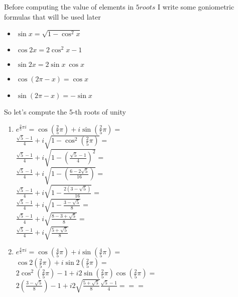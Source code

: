 \documentclass{article}
\begin{document}
Before computing the value of elements in \(5roots\) I write some goniometric formulas that will be used later

\begin{itemize}
    \item \(\sin x = \sqrt{1 - \cos^2 x}\)
    \item \(\cos 2x = 2 \cos^2 x - 1\)
    \item \(\sin 2x = 2\sin x \ \cos x\)
    \item \(\cos \left(2 \pi - x\right) = \cos x \)
    \item \(\sin \left(2 \pi - x\right) = - \sin x \)
\end{itemize}

So let's compute the 5-th roots of unity 

\begin{enumerate}
    \item \(e^{\frac{2}{5} \pi i } = 
        \cos \left( \frac{2}{5} \pi \right) + i \sin \left( \frac{2}{5} \pi \right) = \) \\
        \( \frac{\sqrt{5} - 1}{4} + i \sqrt{1 - \cos^2 \left( \frac{2}{5} \pi \right) } = \) \\
        \( \frac{\sqrt{5} - 1}{4} + i \sqrt{1 - \left( \frac{\sqrt{5} - 1}{4}  \right)^2 } =  \) \\
        \( \frac{\sqrt{5} - 1}{4} + i \sqrt{1 - \left( \frac{6 -2 \sqrt{5} }{16}  \right) } = \) \\
        \(  \frac{\sqrt{5} - 1}{4} + i \sqrt{1 - \frac{2 \left(3 - \sqrt{5}\right) }{16} } = \) \\
       \(  \frac{\sqrt{5} - 1}{4} + i \sqrt{1 - \frac{3 - \sqrt{5}}{8} } = \) \\
        \( \frac{\sqrt{5} - 1}{4} + i \sqrt{ \frac{8 -3 + \sqrt{5}}{8} } = \) \\
        \( \frac{\sqrt{5} - 1}{4} + i \sqrt{ \frac{5 + \sqrt{5}}{8} }
        \)
    \item \(e^{\frac{4}{5} \pi i } = 
        \cos \left( \frac{4}{5} \pi \right) + i \sin \left( \frac{4}{5} \pi \right) = \) \\
        \( \cos 2\left( \frac{2}{5} \pi \right) + i \sin 2\left( \frac{2}{5} \pi \right) = \) \\
        \( 2 \cos^2\left( \frac{2}{5} \pi \right) - 1 + i 2 \sin \left( \frac{2}{5} \pi \right) \cos \left( \frac{2}{5} \pi \right) = \) \\
        \( 2 (\frac{3 - \sqrt{5}}{8}) - 1 + i 2 \sqrt{ \frac{5 + \sqrt{5}}{8}} { \frac{\sqrt{5} - 1}{4}} = = = \) \\

\end{enumerate}
\end{document}
